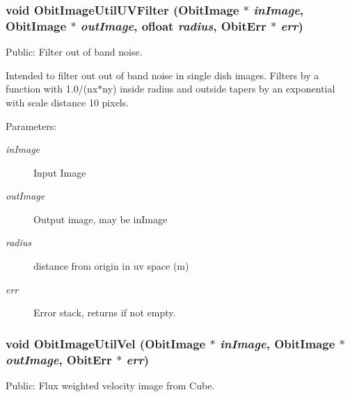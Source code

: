 \subsubsection{\setlength{\rightskip}{0pt plus 5cm}void Obit\-Image\-Util\-UVFilter ({\bf Obit\-Image} $\ast$ {\em in\-Image}, {\bf Obit\-Image} $\ast$ {\em out\-Image}, {\bf ofloat} {\em radius}, {\bf Obit\-Err} $\ast$ {\em err})}\label{ObitImageUtil_8h_a20}


Public: Filter out of band noise. 

Intended to filter out out of band noise in single dish images. Filters by a function with 1.0/(nx$\ast$ny) inside radius and outside tapers by an exponential with scale distance 10 pixels. \begin{Desc}
\item[Parameters:]
\begin{description}
\item[{\em in\-Image}]Input Image \item[{\em out\-Image}]Output image, may be in\-Image \item[{\em radius}]distance from origin in uv space (m) \item[{\em err}]Error stack, returns if not empty. \end{description}
\end{Desc}
\subsubsection{\setlength{\rightskip}{0pt plus 5cm}void Obit\-Image\-Util\-Vel ({\bf Obit\-Image} $\ast$ {\em in\-Image}, {\bf Obit\-Image} $\ast$ {\em out\-Image}, {\bf Obit\-Err} $\ast$ {\em err})}\label{ObitImageUtil_8h_a18}


Public: Flux weighted velocity image from Cube. 

